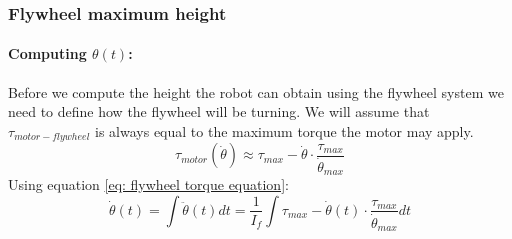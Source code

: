 \subsubsection{Flywheel maximum height}
    \paragraph{Computing $\theta(t)$:} Before we compute the height the robot can obtain using the flywheel system
    we need to define how the flywheel will be turning.
    We will assume that $\tau_{motor-flywheel}$ is always equal to the maximum torque the motor may apply.
    \[\tau_{motor}(\dot{\theta}) \approx \tau_{max}- \dot{\theta}\cdot\frac{\tau_{max}}{\dot{\theta}_{max}}\]
    Using equation \ref{eq: flywheel torque equation}:
    \[\dot{\theta}(t)=\int \ddot{\theta}(t) dt
    = \frac{1}{I_f} \int \tau_{max}- \dot{\theta}(t)\cdot\frac{\tau_{max}}{\dot{\theta}_{max}} dt \]

